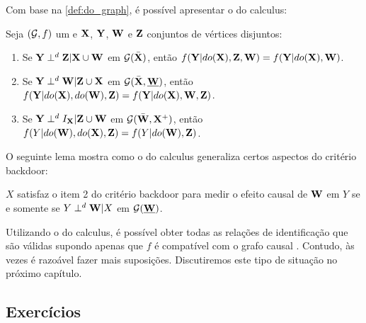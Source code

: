 Com base na \cref{def:do_graph},
é possível apresentar o do calculus:

\begin{theorem}
 Seja $({\mathcal G},f)$ um \CM e ${\mathbf{X}}$, ${\mathbf{Y}}$, ${\mathbf{W}}$ e ${\mathbf{Z}}$ 
 conjuntos de vértices disjuntos:
 \label{thm:do_calculus}
 \begin{enumerate}
  \item  Se ${\mathbf{Y}} \perp^d {\mathbf{Z}} | {\mathbf{X}} \cup {\mathbf{W}}$ em ${\mathcal G}(\bar{{\mathbf{X}}})$, então
  $f({\mathbf{Y}}|do({\mathbf{X}}), {\mathbf{Z}}, {\mathbf{W}}) = f({\mathbf{Y}}|do({\mathbf{X}}), {\mathbf{W}})$.
  \item Se ${\mathbf{Y}} \perp^d {\mathbf{W}} | {\mathbf{Z}} \cup {\mathbf{X}}$ em ${\mathcal G}(\bar{{\mathbf{X}}}, \underline{{\mathbf{W}}})$, então
  $f({\mathbf{Y}}|do({\mathbf{X}}), do({\mathbf{W}}), {\mathbf{Z}}) = f({\mathbf{Y}}|do({\mathbf{X}}), {\mathbf{W}}, {\mathbf{Z}})$.
  \item Se ${\mathbf{Y}} \perp^d I_{{\mathbf{X}}} | {\mathbf{Z}} \cup {\mathbf{W}}$ em ${\mathcal G}(\bar{{\mathbf{W}}}, {\mathbf{X}}^{+})$, então
  $f(Y|do({\mathbf{W}}), do({\mathbf{X}}), {\mathbf{Z}}) = f(Y|do({\mathbf{W}}), {\mathbf{Z}})$.
 \end{enumerate}
\end{theorem}

O seguinte lema mostra como
o do calculus generaliza 
certos aspectos do critério backdoor:

\begin{lemma}
 \label{lemma:do_calculus_backdoor}
 $X$ satisfaz o item 2 do critério backdoor
 para medir o efeito causal de ${\mathbf{W}}$ em $Y$ 
 se e somente se $Y \perp^d {\mathbf{W}} | X$ em ${\mathcal G}(\underline{{\mathbf{W}}})$.
\end{lemma}

Utilizando o do calculus,
é possível obter todas 
as relações de identificação que
são válidas supondo apenas que
$f$ é compatível com 
o grafo causal \citep{Shpitser2006,Shpitser2008}.
Contudo, às vezes é razoável fazer 
mais suposições.
Discutiremos este tipo de situação
no próximo capítulo.

\subsection{Exercícios}

